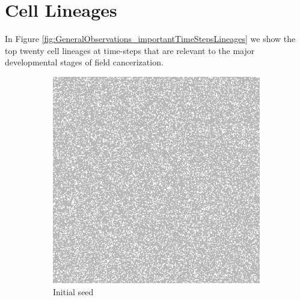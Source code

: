 \documentclass[\main/thesis.tex]{subfiles}
\begin{document}
\section{Cell Lineages}
In Figure \ref{fig:GeneralObservations_importantTimeStepsLineages} we show the top twenty cell lineages at time-steps that are relevant to the major developmental stages of field cancerization.
\begin{figure}[H]
    \centering
    \begin{subfigure}[t]{.45\textwidth}
      \centering
      \includegraphics[width=\textwidth]{images/2_GeneralObservations/Fig6/1_init.jpeg}
      \caption{Initial seed}
      \label{fig:GeneralObservations_initSeedLineages}
    \end{subfigure}
    \begin{subfigure}[t]{.45\textwidth}
      \centering

\end{subfigure}
\end{figure}
\end{document}
